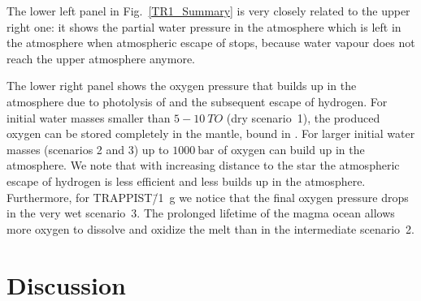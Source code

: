 \documentclass[oneside,twocolumn]{article}
\begin{document}
The lower left panel in  Fig.~\ref{TR1_Summary} is very closely related to the upper right one: it shows the partial water pressure in the atmosphere which is left in the atmosphere when atmospheric escape of  stops, because water vapour does not reach the upper atmosphere anymore.

The lower right panel shows the oxygen pressure that builds up in the atmosphere due to photolysis of  and the subsequent escape of hydrogen.
For initial water masses smaller than $5-\SI{10}{TO}$ (dry scenario~1), the produced oxygen can be stored completely in the mantle, bound in .
For larger initial water masses (scenarios 2 and 3) up to $\SI{1000}{\bar}$ of oxygen can build up in the atmosphere.
We note that with increasing distance to the star the atmospheric escape of hydrogen is less efficient and less  builds up in the atmosphere.
Furthermore, for TRAPPIST\=/1~g we notice that the final oxygen pressure drops in the very wet scenario~3.
The prolonged lifetime of the magma ocean allows more oxygen to dissolve and oxidize the melt than in the intermediate scenario~2. 

\section{Discussion}
\label{sec_discuss}
\end{document}
